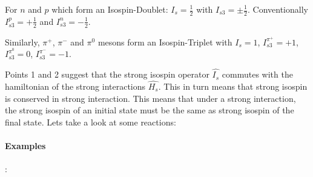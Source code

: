 For $n$ and $p$ which form an Isospin-Doublet: $I_s=\frac{1}{2}$ with $I_{s3}=\pm\frac{1}{2}$. Conventionally $I_{s3}^{p}=+\frac{1}{2}$ and $I_{s3}^{n}=-\frac{1}{2}$. 

Similarly, $\pi^+$, $\pi^-$ and $\pi^0$ mesons form an Isospin-Triplet with 
$I_{s}=1$, $I_{s3}^{\pi^+}=+1$, $I_{s3}^{\pi^0}=0$, $I_{s3}^{\pi^-}=-1$.

Points 1 and 2 suggest that the strong isospin operator $\hat{I_s}$ commutes with the hamiltonian
of the strong interactions $\hat{H_{s}}$. This in turn means that strong isospin is conserved in strong interaction. This means that under a strong interaction, the strong isospin of an initial state must be the same as strong isospin of the final state. Lets take a look at some reactions:

\paragraph{Examples}: 
